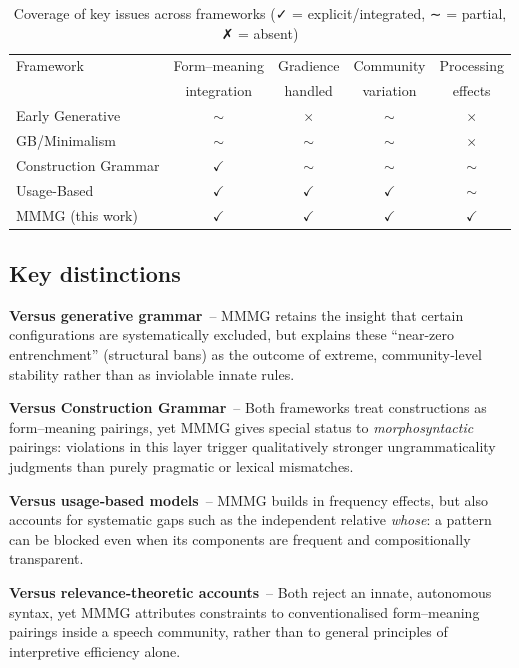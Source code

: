 \documentclass[12pt]{article}
\begin{document}
\begin{table}[h]
\centering
\small
\caption{Coverage of key issues across frameworks (✓ = explicit/integrated, ∼ = partial, ✗ = absent)}
\begin{tabular}{@{}lcccc@{}}
\toprule
Framework & Form–meaning & Gradience & Community & Processing \\
          & integration  & handled   & variation & effects \\
\midrule
Early Generative     & $\sim$ & $\times$ & $\sim$ & $\times$ \\
GB/Minimalism        & $\sim$ & $\sim$   & $\sim$ & $\times$ \\
Construction Grammar & $\checkmark$ & $\sim$ & $\sim$ & $\sim$ \\
Usage-Based          & $\checkmark$ & $\checkmark$ & $\checkmark$ & $\sim$ \\
MMMG (this work)     & $\checkmark$ & $\checkmark$ & $\checkmark$ & $\checkmark$ \\
\bottomrule
\end{tabular}
\end{table}


\subsection{Key distinctions}

\textbf{Versus generative grammar}~--  
MMMG retains the insight that certain configurations are systematically excluded, but explains these \enquote{near-zero entrenchment} (structural bans) as the outcome of extreme, community‑level stability rather than as inviolable innate rules.

\textbf{Versus Construction Grammar}~--  
Both frameworks treat constructions as form–meaning pairings, yet MMMG gives special status to \emph{morphosyntactic} pairings: violations in this layer trigger qualitatively stronger ungrammaticality judgments than purely pragmatic or lexical mismatches.

\textbf{Versus usage‑based models}~--  
MMMG builds in frequency effects, but also accounts for systematic gaps such as the independent relative \textit{whose}: a pattern can be blocked even when its components are frequent and compositionally transparent.

\textbf{Versus relevance‑theoretic accounts}~--  
Both reject an innate, autonomous syntax, yet MMMG attributes constraints to conventionalised form–meaning pairings inside a speech community, rather than to general principles of interpretive efficiency alone.
\end{document}
